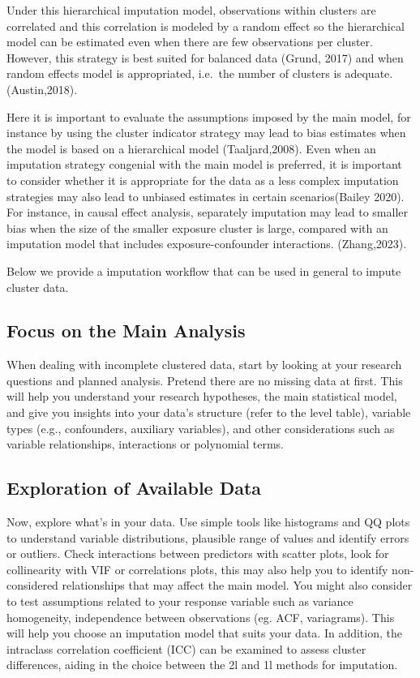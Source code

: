 \documentclass[
  article]{jss}
\begin{document}
Under this hierarchical imputation model, observations within clusters
are correlated and this correlation is modeled by a random effect so the
hierarchical model can be estimated even when there are few observations
per cluster. However, this strategy is best suited for balanced data
(Grund, 2017) and when random effects model is appropriated, i.e.~the
number of clusters is adequate. (Austin,2018).

Here it is important to evaluate the assumptions imposed by the main
model, for instance by using the cluster indicator strategy may lead to
bias estimates when the model is based on a hierarchical model
(Taaljard,2008). Even when an imputation strategy congenial with the
main model is preferred, it is important to consider whether it is
appropriate for the data as a less complex imputation strategies may
also lead to unbiased estimates in certain scenarios(Bailey 2020). For
instance, in causal effect analysis, separately imputation may lead to
smaller bias when the size of the smaller exposure cluster is large,
compared with an imputation model that includes exposure-confounder
interactions. (Zhang,2023).

Below we provide a imputation workflow that can be used in general to
impute cluster data.

\hypertarget{focus-on-the-main-analysis}{%
\subsection{Focus on the Main
Analysis}\label{focus-on-the-main-analysis}}

When dealing with incomplete clustered data, start by looking at your
research questions and planned analysis. Pretend there are no missing
data at first. This will help you understand your research hypotheses,
the main statistical model, and give you insights into your data's
structure (refer to the level table), variable types (e.g., confounders,
auxiliary variables), and other considerations such as variable
relationships, interactions or polynomial terms.

\hypertarget{exploration-of-available-data}{%
\subsection{Exploration of Available
Data}\label{exploration-of-available-data}}

Now, explore what's in your data. Use simple tools like histograms and
QQ plots to understand variable distributions, plausible range of values
and identify errors or outliers. Check interactions between predictors
with scatter plots, look for collinearity with VIF or correlations
plots, this may also help you to identify non-considered relationships
that may affect the main model. You might also consider to test
assumptions related to your response variable such as variance
homogeneity, independence between observations (eg. ACF, variagrams).
This will help you choose an imputation model that suits your data. In
addition, the intraclass correlation coefficient (ICC) can be examined
to assess cluster differences, aiding in the choice between the 2l and
1l methods for imputation.
\end{document}
